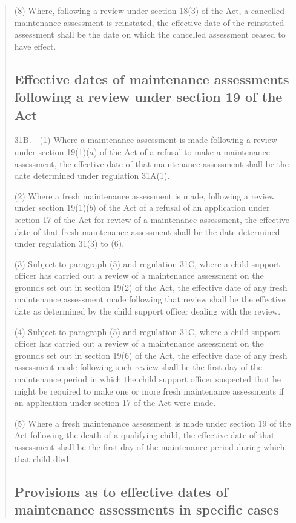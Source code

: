 \documentclass[a4paper]{article}
\begin{document}
\begin{quotation}
(8) Where, following a review under section 18(3) of the Act, a cancelled maintenance assessment is reinstated, the effective date of the reinstated assessment shall be the date on which the cancelled assessment ceased to have effect.

\subsection*{Effective dates of maintenance assessments following a review under section 19 of the Act}

31B.—(1) Where a maintenance assessment is made following a review under section 19(1)($a$) of the Act of a refusal to make a maintenance assessment, the effective date of that maintenance assessment shall be the date determined under regulation 31A(1).

(2) Where a fresh maintenance assessment is made, following a review under section 19(1)($b$) of the Act of a refusal of an application under section 17 of the Act for review of a maintenance assessment, the effective date of that fresh maintenance assessment shall be the date determined under regulation 31(3) to (6).

(3) Subject to paragraph (5) and regulation 31C, where a child support officer has carried out a review of a maintenance assessment on the grounds set out in section 19(2) of the Act, the effective date of any fresh maintenance assessment made following that review shall be the effective date as determined by the child support officer dealing with the review.

(4) Subject to paragraph (5) and regulation 31C, where a child support officer has carried out a review of a maintenance assessment on the grounds set out in section 19(6) of the Act, the effective date of any fresh assessment made following such review shall be the first day of the maintenance period in which the child support officer suspected that he might be required to make one or more fresh maintenance assessments if an application under section 17 of the Act were made.

(5) Where a fresh maintenance assessment is made under section 19 of the Act following the death of a qualifying child, the effective date of that assessment shall be the first day of the maintenance period during which that child died.

\subsection*{Provisions as to effective dates of maintenance assessments in specific cases}


\end{quotation}
\end{document}
